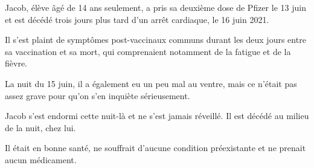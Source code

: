 Jacob, élève âgé de 14 ans seulement, a pris sa deuxième dose de Pfizer le 13
juin et est décédé trois jours plus tard d'un arrêt cardiaque, le 16 juin 2021.

Il s'est plaint de symptômes post-vaccinaux communs durant les deux jours entre
sa vaccination et sa mort, qui comprenaient notamment de la fatigue et de la
fièvre.

La nuit du 15 juin, il a également eu un peu mal au ventre, mais ce n'était pas
assez grave pour qu'on s'en inquiète sérieusement.

Jacob s'est endormi cette nuit-là et ne s'est jamais réveillé. Il est décédé au
milieu de la nuit, chez lui.

Il était en bonne santé, ne souffrait d'aucune condition préexistante et ne
prenait aucun médicament.

